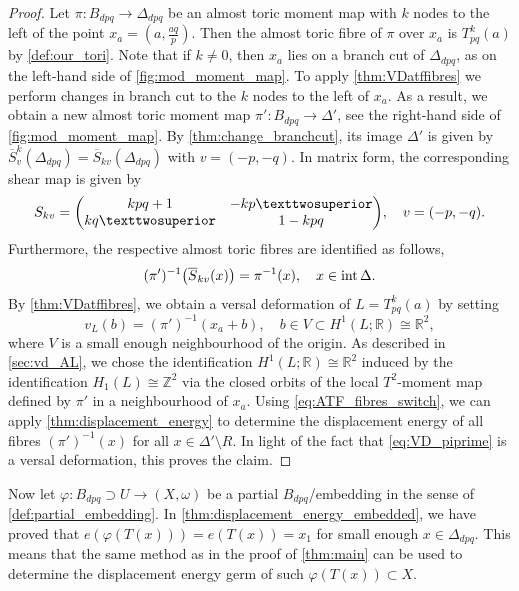 \documentclass[12pt,a4paper,abstract=true,final]{scrartcl}
\begin{document}
\begin{proof}
    Let $\pi \colon B_{dpq} \rightarrow \Delta_{dpq}$ be an almost toric moment map with $k$ nodes to the left of the point $x_a =\left( a, \frac{aq}{p}\right)$.
Then the almost toric fibre of $\pi$ over $x_a$ is $T^k_{pq}(a)$ by \cref{def:our_tori}.
Note that if $k \neq 0$, then $x_a$ lies on a branch cut of $\Delta_{dpq}$, as on the left-hand side of \cref{fig:mod_moment_map}.
To apply \cref{thm:VDatffibres} we perform changes in branch cut to the $k$ nodes to the left of $x_a$.
As a result, we obtain a new almost toric moment map $\pi' \colon B_{dpq} \rightarrow \Delta'$, see the right-hand side of \cref{fig:mod_moment_map}.
By \cref{thm:change_branchcut}, its image $\Delta'$ is given by $\overline{S}_v^k (\Delta_{dpq}) = \overline{S}_{kv}(\Delta_{dpq})$ with $v = (-p,-q)$.
In matrix form, the corresponding shear map is given by 
    \begin{equation}
        \label{eq:displacement_energy_germ}
        S_{kv} = 
        \mqty(kpq+1 & -kp²\\ kq² & 1-kpq), \quad
        v = (-p,-q).
    \end{equation}
    Furthermore, the respective almost toric fibres are identified as follows,
    \begin{equation}
        \label{eq:ATF_fibres_switch}
        (\pi')^{-1}\qty(\overline{S}_{kv}(x)) = \pi^{-1}(x), \quad
        x \in \operatorname{int} \Delta.
    \end{equation}
    By \cref{thm:VDatffibres}, we obtain a versal deformation of $L =T^k_{pq}(a)$ by setting
    \begin{equation}
        \label{eq:VD_piprime}
        v_L(b) = (\pi')^{-1}(x_a + b), \quad
        b \in V \subset H^1(L; \mathbb{R}) \cong \mathbb{R}^2,
    \end{equation}
    where $V$ is a small enough neighbourhood of the origin.
As described in \cref{sec:vd_AL}, we chose the identification $H^1(L; \mathbb{R}) \cong \mathbb{R}^2$ induced by the identification $H_1(L) \cong \mathbb{Z}^2$ via the closed orbits of the local $T^2$-moment map defined by $\pi'$ in a neighbourhood of $x_a$.
Using \eqref{eq:ATF_fibres_switch}, we can apply \cref{thm:displacement_energy} to determine the displacement energy of all fibres $(\pi')^{-1}(x)$ for all $x \in \Delta' \setminus R$.
In light of the fact that \eqref{eq:VD_piprime} is a versal deformation, this proves the claim.
\end{proof}

Now let $\varphi \colon B_{dpq} \supset U \rightarrow (X,\omega)$ be a partial $B_{dpq}$\-/embedding in the sense of \cref{def:partial_embedding}.
In \cref{thm:displacement_energy_embedded}, we have proved that $e(\varphi(T(x))) = e(T(x)) = x_1$ for small enough $x \in \Delta_{dpq}$.
This means that the same method as in the proof of \cref{thm:main} can be used to determine the displacement energy germ of such $\varphi(T(x)) \subset X$. 
\end{document}
